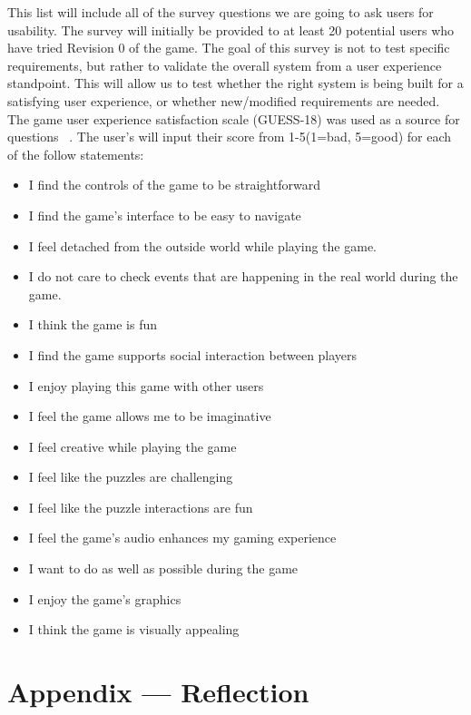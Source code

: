 \documentclass[12pt, titlepage]{article}
\begin{document}
This list will include all of the survey questions we are going to ask users for usability. The survey will initially be provided to at least 20 potential users who have tried Revision 0 of the game. The goal of this survey is not to test specific requirements, but rather to validate the overall system from a user experience standpoint. This will allow us to test whether the right system is being built for a satisfying user experience, or whether new/modified requirements are needed. The game user experience satisfaction scale (GUESS-18) was used as a source for questions ~\citep{GUESS-18}. The user's will input their score from 1-5(1=bad, 5=good) for each of the follow statements:
\begin{itemize}
    \item I find the controls of the game to be straightforward
    \item I find the game's interface to be easy to navigate
    \item I feel detached from the outside world while playing the game.
    \item I do not care to check events that are happening in the real world during the game.
    \item I think the game is fun
    \item I find the game supports social interaction between players
    \item I enjoy playing this game with other users
    \item I feel the game allows me to be imaginative
    \item I feel creative while playing the game
    \item I feel like the puzzles are challenging
    \item I feel like the puzzle interactions are fun
    \item I feel the game's audio enhances my gaming experience
    \item I want to do as well as possible during the game
    \item I enjoy the game's graphics
    \item I think the game is visually appealing
\end{itemize}

\newpage{}
\section*{Appendix --- Reflection}

\end{document}
